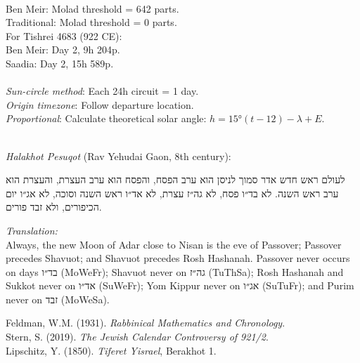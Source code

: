\begin{technical}
\\[0.2em]
Ben Meir: Molad threshold = 642 parts.\\
Traditional: Molad threshold = 0 parts.\\
For Tishrei 4683 (922 CE):\\
Ben Meir: Day 2, 9h 204p.\\
Saadia: Day 2, 15h 589p.\\

\\[0.2em]
\textit{Sun-circle method}: Each 24h circuit = 1 day.\\
\textit{Origin timezone}: Follow departure location.\\
\textit{Proportional}: Calculate theoretical solar angle: $h = 15°(t-12) - \lambda + E$.

\\[0.2em]
\textit{Halakhot Pesuqot} (Rav Yehudai Gaon, 8th century):

\begin{hebrew}
לעולם ראש חדש אדר סמוך לניסן הוא ערב הפסח,
והפסח הוא ערב העצרת,
והעצרת הוא ערב ראש השנה.
לא בד״ו פסח,
לא גה״ז עצרת,
לא אד״ו ראש השנה וסוכה,
לא אג״ו יום הכיפורים,
ולא זבד פורים.
\end{hebrew}

\textit{Translation:}\\
Always, the new Moon of Adar close to Nisan is the eve of Passover; Passover precedes Shavuot; and Shavuot precedes Rosh Hashanah. Passover never occurs on days \texthebrew{בד״ו} (MoWeFr); Shavuot never on \texthebrew{גה״ז} (TuThSa); Rosh Hashanah and Sukkot never on \texthebrew{אד״ו} (SuWeFr); Yom Kippur never on \texthebrew{אג״ו} (SuTuFr); and Purim never on \texthebrew{זבד} (MoWeSa).

\techref
{\footnotesize
Feldman, W.M. (1931). \textit{Rabbinical Mathematics and Chronology}.\\
Stern, S. (2019). \textit{The Jewish Calendar Controversy of 921/2}.\\
Lipschitz, Y. (1850). \textit{Tiferet Yisrael}, Berakhot 1.
}
\end{technical}